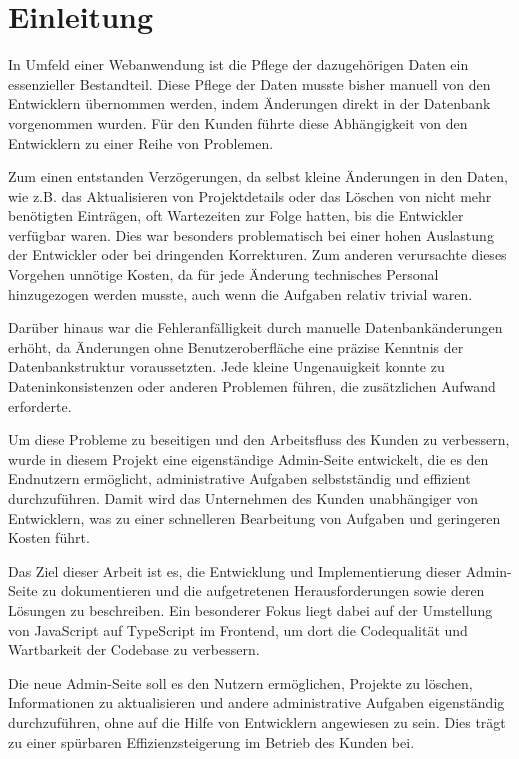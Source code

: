 \section{Einleitung}

In Umfeld einer Webanwendung ist die Pflege der dazugehörigen Daten ein essenzieller Bestandteil.
Diese Pflege der Daten musste bisher manuell von den Entwicklern übernommen werden, indem Änderungen direkt in der Datenbank vorgenommen wurden.
Für den Kunden führte diese Abhängigkeit von den Entwicklern zu einer Reihe von Problemen.

Zum einen entstanden Verzögerungen, da selbst kleine Änderungen in den Daten, wie z.B. das Aktualisieren von Projektdetails oder das Löschen von nicht mehr benötigten Einträgen, oft Wartezeiten zur Folge hatten, bis die Entwickler verfügbar waren.
Dies war besonders problematisch bei einer hohen Auslastung der Entwickler oder bei dringenden Korrekturen.
Zum anderen verursachte dieses Vorgehen unnötige Kosten, da für jede Änderung technisches Personal hinzugezogen werden musste, auch wenn die Aufgaben relativ trivial waren.

Darüber hinaus war die Fehleranfälligkeit durch manuelle Datenbankänderungen erhöht, da Änderungen ohne Benutzeroberfläche eine präzise Kenntnis der Datenbankstruktur voraussetzten.
Jede kleine Ungenauigkeit konnte zu Dateninkonsistenzen oder anderen Problemen führen, die zusätzlichen Aufwand erforderte.

Um diese Probleme zu beseitigen und den Arbeitsfluss des Kunden zu verbessern, wurde in diesem Projekt eine eigenständige Admin-Seite entwickelt, die es den Endnutzern ermöglicht, administrative Aufgaben selbstständig und effizient durchzuführen.
Damit wird das Unternehmen des Kunden unabhängiger von Entwicklern, was zu einer schnelleren Bearbeitung von Aufgaben und geringeren Kosten führt.

Das Ziel dieser Arbeit ist es, die Entwicklung und Implementierung dieser Admin-Seite zu dokumentieren und die aufgetretenen Herausforderungen sowie deren Lösungen zu beschreiben.
Ein besonderer Fokus liegt dabei auf der Umstellung von JavaScript auf TypeScript im Frontend, um dort die Codequalität und Wartbarkeit der Codebase zu verbessern.

Die neue Admin-Seite soll es den Nutzern ermöglichen, Projekte zu löschen, Informationen zu aktualisieren und andere administrative Aufgaben eigenständig durchzuführen, ohne auf die Hilfe von Entwicklern angewiesen zu sein.
Dies trägt zu einer spürbaren Effizienzsteigerung im Betrieb des Kunden bei.